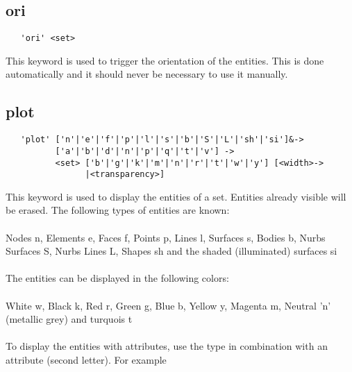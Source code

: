\documentclass{article}
\begin{document}
\subsection{\label{ori}ori}
\begin{verbatim}
   'ori' <set> 
\end{verbatim}
This keyword is used to trigger the orientation of the entities. This is done automatically and it should never be necessary to use it manually.

\subsection{\label{plot}plot}
\begin{verbatim}
   'plot' ['n'|'e'|'f'|'p'|'l'|'s'|'b'|'S'|'L'|'sh'|'si']&->
          ['a'|'b'|'d'|'n'|'p'|'q'|'t'|'v'] ->
          <set> ['b'|'g'|'k'|'m'|'n'|'r'|'t'|'w'|'y'] [<width>->
                |<transparency>] 
\end{verbatim}
This keyword is used to display the entities of a set. Entities already visible will be erased. The following types of entities are known:\\\\
Nodes n, Elements e, Faces f, Points p, Lines l, Surfaces s, Bodies b, Nurbs Surfaces S, Nurbs Lines L, Shapes sh and the shaded (illuminated) surfaces si\\\\The entities can be displayed in the following colors:\\\\
White w, Black k, Red r, Green g, Blue b, Yellow y, Magenta m, Neutral 'n' (metallic grey) and turquois t\\\\ To display the entities with attributes, use the type in combination with an attribute (second letter). For example\\\\
\end{document}
